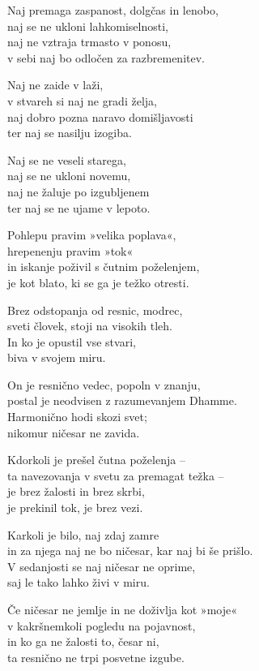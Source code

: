 Naj premaga zaspanost, dolgčas in lenobo,\\
naj se ne ukloni lahkomiselnosti,\\
naj ne vztraja trmasto v ponosu,\\
v sebi naj bo odločen za razbremenitev.

Naj ne zaide v laži,\\
v stvareh si naj ne gradi želja,\\
naj dobro pozna naravo domišljavosti\\
ter naj se nasilju izogiba.

Naj se ne veseli starega,\\
naj se ne ukloni novemu,\\
naj ne žaluje po izgubljenem\\
ter naj se ne ujame v lepoto.

Pohlepu pravim »velika poplava«,\\
hrepenenju pravim »tok«\\
in iskanje poživil s čutnim poželenjem,\\
je kot blato, ki se ga je težko otresti.

Brez odstopanja od resnic, modrec,\\
sveti človek, stoji na visokih tleh.\\
In ko je opustil vse stvari,\\
biva v svojem miru.

On je resnično vedec, popoln v znanju,\\
postal je neodvisen z razumevanjem Dhamme.\\
Harmonično hodi skozi svet;\\
nikomur ničesar ne zavida.

Kdorkoli je prešel čutna poželenja --\\
ta navezovanja v svetu za premagat težka --\\
je brez žalosti in brez skrbi,\\
je prekinil tok, je brez vezi.

Karkoli je bilo, naj zdaj zamre\\
in za njega naj ne bo ničesar, kar naj bi še prišlo.\\
V sedanjosti se naj ničesar ne oprime,\\
saj le tako lahko živi v miru.

Če ničesar ne jemlje in ne doživlja kot »moje«\\
v kakršnemkoli pogledu na pojavnost,\\
in ko ga ne žalosti to, česar ni,\\
ta resnično ne trpi posvetne izgube.

